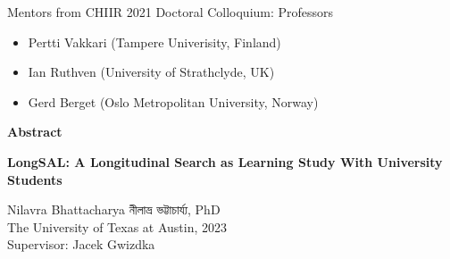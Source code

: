 \documentclass[letterpaper, nobind]{templates/ociamthesis}
\providecommand{\tightlist}{%
  \setlength{\itemsep}{0pt}\setlength{\parskip}{0pt}}
\begin{document}
\begin{romanpages}
\begin{acknowledgements}
 Mentors from CHIIR 2021 Doctoral Colloquium: Professors

 \begin{itemize}
 \tightlist
 \item
   Pertti Vakkari (Tampere Univerisity, Finland)
 \item
   Ian Ruthven (University of Strathclyde, UK)
 \item
   Gerd Berget (Oslo Metropolitan University, Norway)
 \end{itemize}
\end{acknowledgements}






\begin{center}
  \textbf{Abstract}\\
  
  \vspace{18pt}
  
  \begin{spacing}{2}
    {\Large{\textbf{LongSAL: A Longitudinal Search as Learning Study With University Students}}}
  \end{spacing}

  \vspace{18pt}

  \begin{spacing}{1.4}
    Nilavra Bhattacharya 
    {\secondlanguage নীলাভ্র ভট্টাচার্য্য}, 
    PhD\\
    The University of Texas at Austin, 
    2023\\
    \vspace{18pt}
    Supervisor: Jacek Gwizdka
  \end{spacing}

\end{center}


\end{romanpages}
\end{document}
